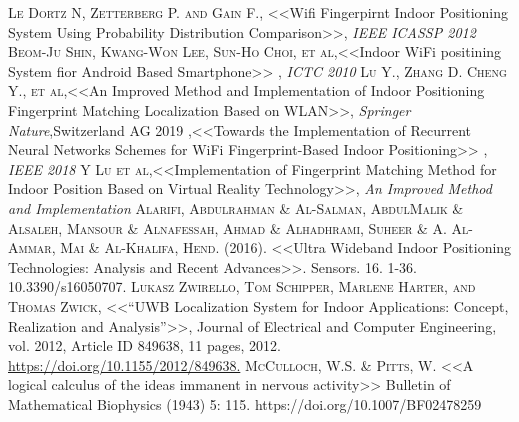 \documentclass[12pt]{report}
\begin{document}
\begin{thebibliography}{X}
 \textsc{Le Dortz N, Zetterberg P. and Gain F.}, <<Wifi Fingerpirnt Indoor Positioning System Using Probability Distribution Comparison>>, \textit{IEEE ICASSP 2012}
 \textsc{Beom-Ju Shin, Kwang-Won Lee, Sun-Ho Choi, et al},<<Indoor WiFi positining System fior Android Based Smartphone>> , \textit{ICTC 2010}
 \textsc{Lu Y., Zhang D. Cheng Y., et al},<<An Improved Method and Implementation of Indoor Positioning Fingerprint Matching Localization Based on WLAN>>, \textit{Springer Nature},Switzerland AG 2019
 \textsc{},<<Towards the Implementation of Recurrent Neural Networks Schemes for WiFi Fingerprint-Based Indoor Positioning>> , \textit{IEEE 2018}
 \textsc{Y Lu et al},<<Implementation of Fingerprint Matching Method for Indoor Position Based on Virtual Reality Technology>>, \textit{An Improved Method and Implementation}
 \textsc{Alarifi, Abdulrahman \& Al-Salman, AbdulMalik \& Alsaleh, Mansour \& Alnafessah, Ahmad \& Alhadhrami, Suheer \& A. Al-Ammar, Mai \& Al-Khalifa, Hend}. (2016). <<Ultra Wideband Indoor Positioning Technologies: Analysis and Recent Advances>>. Sensors. 16. 1-36. 10.3390/s16050707.
 \textsc{Lukasz Zwirello, Tom Schipper, Marlene Harter, and Thomas Zwick}, <<“UWB Localization System for Indoor Applications: Concept, Realization and Analysis”>>, Journal of Electrical and Computer Engineering, vol. 2012, Article ID 849638, 11 pages, 2012. \url{https://doi.org/10.1155/2012/849638.}
\textsc{McCulloch, W.S. & Pitts, W.} <<A logical calculus of the ideas immanent in nervous activity>> Bulletin of Mathematical Biophysics (1943) 5: 115. https://doi.org/10.1007/BF02478259
\end{thebibliography}

	\appendix
%	
	
\end{document}

